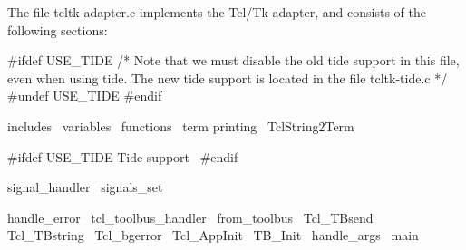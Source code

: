 

The file tcltk-adapter.c implements the Tcl/Tk adapter, and consists
of the following sections:
\endmoddef\let\nwnotused=\nwoutput{}

#ifdef USE_TIDE
/* Note that we must disable the old tide support in this file,
   even when using tide. The new tide support is located in the
   file tcltk-tide.c */
#undef USE_TIDE
#endif

\LA{}includes~{\nwtagstyle{}}\RA{}
\LA{}variables~{\nwtagstyle{}}\RA{}
\LA{}functions~{\nwtagstyle{}}\RA{}
\LA{}term printing~{\nwtagstyle{}}\RA{}
\LA{}TclString2Term~{\nwtagstyle{}}\RA{}


#ifdef USE_TIDE
\LA{}Tide support~{\nwtagstyle{}}\RA{}
#endif

\LA{}signal_handler~{\nwtagstyle{}}\RA{}
\LA{}signals_set~{\nwtagstyle{}}\RA{}

\LA{}handle_error~{\nwtagstyle{}}\RA{}
\LA{}tcl_toolbus_handler~{\nwtagstyle{}}\RA{}
\LA{}from_toolbus~{\nwtagstyle{}}\RA{}
\LA{}Tcl_TBsend~{\nwtagstyle{}}\RA{}
\LA{}Tcl_TBstring~{\nwtagstyle{}}\RA{}
\LA{}Tcl_bgerror~{\nwtagstyle{}}\RA{}
\LA{}Tcl_AppInit~{\nwtagstyle{}}\RA{}
\LA{}TB_Init~{\nwtagstyle{}}\RA{}
\LA{}handle_args~{\nwtagstyle{}}\RA{}
\LA{}main~{\nwtagstyle{}}\RA{}
\nwnotused{tcltk-adapter.c*}\nwendcode{}\nwdocspar

